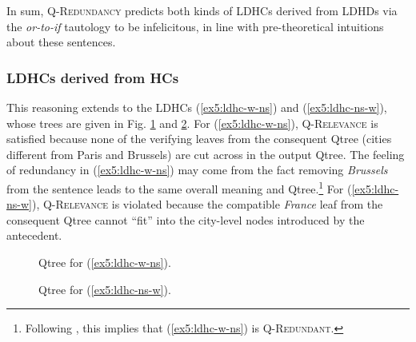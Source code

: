 In sum, \textsc{Q-Redundancy} predicts both kinds of LDHCs derived from LDHDs via the \textit{or-to-if} tautology to be infelicitous, in line with pre-theoretical intuitions about these sentences.




\subsubsection{LDHCs derived from HCs}

This reasoning extends to the LDHCs (\ref{ex5:ldhc-w-ns}) and (\ref{ex5:ldhc-ns-w}), whose trees are given in Fig. \ref{fig5:ldhc-non-scalar-w-ns} and \ref{fig5:ldhc-non-scalar-ns-w}. For (\ref{ex5:ldhc-w-ns}), \textsc{Q-Relevance} is satisfied because none of the verifying leaves from the consequent Qtree (cities different from Paris and Brussels) are cut across in the output Qtree. The feeling of redundancy in (\ref{ex5:ldhc-w-ns}) may come from the fact removing \textit{Brussels} from the sentence leads to the same overall meaning and Qtree.\footnote{Following \citet{HenotMortier2024a,HenotMortier2024b}, this implies that (\ref{ex5:ldhc-w-ns}) is \textsc{Q-Redundant}.} For (\ref{ex5:ldhc-ns-w}), \textsc{Q-Relevance} is violated because the compatible \textit{France} leaf from the consequent Qtree cannot ``fit'' into the city-level nodes introduced by the antecedent.


\begin{minipage}{.45\linewidth}
	\centering
	\begin{figure}[H]
		\centering
		\caption{Qtree for (\ref{ex5:ldhc-w-ns}).}\label{fig5:ldhc-non-scalar-w-ns}
	\end{figure}
\end{minipage}
\hfill
\begin{minipage}{.45\linewidth}
	\centering
	\begin{figure}[H]
		\centering
		\caption{Qtree for (\ref{ex5:ldhc-ns-w}).}\label{fig5:ldhc-non-scalar-ns-w}
	\end{figure}
\end{minipage}





